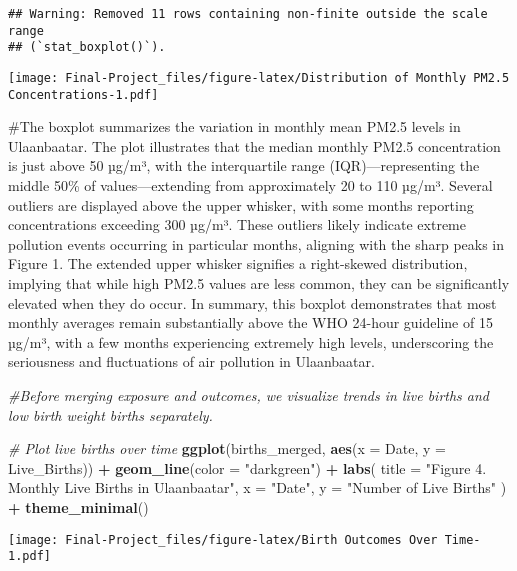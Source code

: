 \documentclass[
]{article}
\newenvironment{Shaded}{\begin{snugshade}}{\end{snugshade}}
\newcommand{\AttributeTok}[1]{\textcolor[rgb]{0.13,0.29,0.53}{#1}}
\newcommand{\CommentTok}[1]{\textcolor[rgb]{0.56,0.35,0.01}{\textit{#1}}}
\newcommand{\FunctionTok}[1]{\textcolor[rgb]{0.13,0.29,0.53}{\textbf{#1}}}
\newcommand{\NormalTok}[1]{#1}
\newcommand{\SpecialCharTok}[1]{\textcolor[rgb]{0.81,0.36,0.00}{\textbf{#1}}}
\newcommand{\StringTok}[1]{\textcolor[rgb]{0.31,0.60,0.02}{#1}}
\begin{document}
\begin{verbatim}
## Warning: Removed 11 rows containing non-finite outside the scale range
## (`stat_boxplot()`).
\end{verbatim}

\texttt{[image: Final-Project\_files/figure-latex/Distribution of Monthly PM2.5 Concentrations-1.pdf]}

\#The boxplot summarizes the variation in monthly mean PM2.5 levels in
Ulaanbaatar. The plot illustrates that the median monthly PM2.5
concentration is just above 50 µg/m³, with the interquartile range
(IQR)---representing the middle 50\% of values---extending from
approximately 20 to 110 µg/m³. Several outliers are displayed above the
upper whisker, with some months reporting concentrations exceeding 300
µg/m³. These outliers likely indicate extreme pollution events occurring
in particular months, aligning with the sharp peaks in Figure 1. The
extended upper whisker signifies a right-skewed distribution, implying
that while high PM2.5 values are less common, they can be significantly
elevated when they do occur. In summary, this boxplot demonstrates that
most monthly averages remain substantially above the WHO 24-hour
guideline of 15 µg/m³, with a few months experiencing extremely high
levels, underscoring the seriousness and fluctuations of air pollution
in Ulaanbaatar.

\begin{Shaded}
\begin{Highlighting}[]
\CommentTok{\#Before merging exposure and outcomes, we visualize trends in live births and low birth weight births separately.}

\CommentTok{\# Plot live births over time}
\FunctionTok{ggplot}\NormalTok{(births\_merged, }\FunctionTok{aes}\NormalTok{(}\AttributeTok{x =}\NormalTok{ Date, }\AttributeTok{y =}\NormalTok{ Live\_Births)) }\SpecialCharTok{+}
  \FunctionTok{geom\_line}\NormalTok{(}\AttributeTok{color =} \StringTok{"darkgreen"}\NormalTok{) }\SpecialCharTok{+}
  \FunctionTok{labs}\NormalTok{(}
    \AttributeTok{title =} \StringTok{"Figure 4. Monthly Live Births in Ulaanbaatar"}\NormalTok{,}
    \AttributeTok{x =} \StringTok{"Date"}\NormalTok{,}
    \AttributeTok{y =} \StringTok{"Number of Live Births"}
\NormalTok{  ) }\SpecialCharTok{+}
  \FunctionTok{theme\_minimal}\NormalTok{()}
\end{Highlighting}
\end{Shaded}

\texttt{[image: Final-Project\_files/figure-latex/Birth Outcomes Over Time-1.pdf]}
\end{document}
